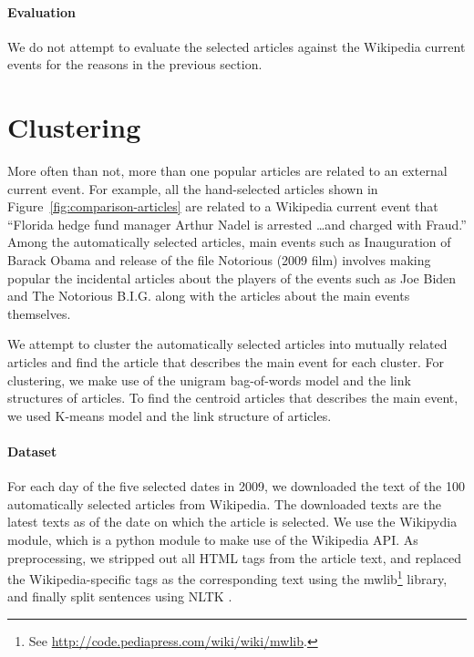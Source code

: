 \documentclass[11pt]{article}
\newcommand{\war}[1]{{\sf\small #1}}
\begin{document}
\paragraph{Evaluation}
We do not attempt to evaluate the selected articles against the Wikipedia current events for the reasons in the previous section.

\section{Clustering}
\label{sec:clustering}

More often than not, more than one popular articles are related to an external current event.
For example, all the hand-selected articles shown in Figure~\ref{fig:comparison-articles}
are related to a Wikipedia current event that ``Florida hedge fund manager Arthur Nadel is arrested \ldots and charged with Fraud.''
Among the automatically selected articles, main events such as \war{Inauguration of Barack Obama} and release of the file \war{Notorious (2009 film)} involves making popular the incidental articles about the players of the events such as \war{Joe Biden} and \war{The Notorious B.I.G.} along with the articles about the main events themselves.

We attempt to cluster the automatically selected articles into mutually related articles and find the article that describes the main event for each cluster. For clustering, we make use of the unigram bag-of-words model and the link structures of articles. To find the centroid articles that describes the main event, we used K-means model and the link structure of articles.

\paragraph{Dataset} For each day of the five selected dates in 2009,
we downloaded the text of the 100 automatically selected articles from Wikipedia.
The downloaded texts are the latest texts as of the date on which the article is selected.
We use the Wikipydia module, which is a python module to make use of the Wikipedia API.
As preprocessing, we stripped out all HTML tags from the article text, and
replaced the Wikipedia-specific tags as the corresponding text using the mwlib\footnote{See \url{http://code.pediapress.com/wiki/wiki/mwlib}.} library,
and finally split sentences using NLTK \cite{Loper02NLTK}.
\end{document}

